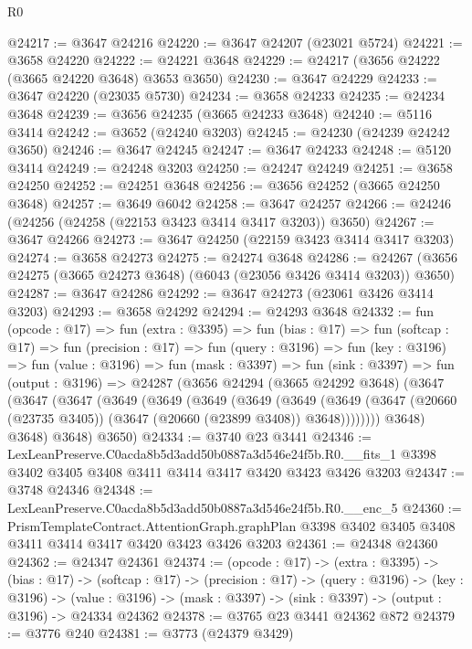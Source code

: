 \begin{lexlean}{R0}
\begin{coremodule}
@24217 := @3647 @24216
@24220 := @3647 @24207 (@23021 @5724)
@24221 := @3658 @24220
@24222 := @24221 @3648
@24229 := @24217 (@3656 @24222 (@3665 @24220 @3648) @3653 @3650)
@24230 := @3647 @24229
@24233 := @3647 @24220 (@23035 @5730)
@24234 := @3658 @24233
@24235 := @24234 @3648
@24239 := @3656 @24235 (@3665 @24233 @3648)
@24240 := @5116 @3414
@24242 := @3652 (@24240 @3203)
@24245 := @24230 (@24239 @24242 @3650)
@24246 := @3647 @24245
@24247 := @3647 @24233
@24248 := @5120 @3414
@24249 := @24248 @3203
@24250 := @24247 @24249
@24251 := @3658 @24250
@24252 := @24251 @3648
@24256 := @3656 @24252 (@3665 @24250 @3648)
@24257 := @3649 @6042
@24258 := @3647 @24257
@24266 := @24246 (@24256 (@24258 (@22153 @3423 @3414 @3417 @3203)) @3650)
@24267 := @3647 @24266
@24273 := @3647 @24250 (@22159 @3423 @3414 @3417 @3203)
@24274 := @3658 @24273
@24275 := @24274 @3648
@24286 := @24267 (@3656 @24275 (@3665 @24273 @3648) (@6043 (@23056 @3426 @3414 @3203)) @3650)
@24287 := @3647 @24286
@24292 := @3647 @24273 (@23061 @3426 @3414 @3203)
@24293 := @3658 @24292
@24294 := @24293 @3648
@24332 := fun (opcode : @17) =>
  fun (extra : @3395) =>
  fun (bias : @17) =>
  fun (softcap : @17) =>
  fun (precision : @17) =>
  fun (query : @3196) =>
  fun (key : @3196) =>
  fun (value : @3196) =>
  fun (mask : @3397) =>
  fun (sink : @3397) =>
  fun (output : @3196) =>
  @24287
    (@3656
      @24294
      (@3665 @24292 @3648)
      (@3647
        (@3647
          (@3647
            (@3649
              (@3649
                (@3649
                  (@3649
                    (@3649
                      (@3649
                        (@3647 (@20660 (@23735 @3405)) (@3647 (@20660 (@23899 @3408)) @3648))))))))
            @3648)
          @3648)
        @3648)
      @3650)
@24334 := @3740 @23 @3441
@24346 := LexLeanPreserve.C0acda8b5d3add50b0887a3d546e24f5b.R0.__fits_1
    @3398
    @3402
    @3405
    @3408
    @3411
    @3414
    @3417
    @3420
    @3423
    @3426
    @3203
@24347 := @3748 @24346
@24348 := LexLeanPreserve.C0acda8b5d3add50b0887a3d546e24f5b.R0.__enc_5
@24360 := PrismTemplateContract.AttentionGraph.graphPlan
    @3398
    @3402
    @3405
    @3408
    @3411
    @3414
    @3417
    @3420
    @3423
    @3426
    @3203
@24361 := @24348 @24360
@24362 := @24347 @24361
@24374 := (opcode : @17) ->
  (extra : @3395) ->
  (bias : @17) ->
  (softcap : @17) ->
  (precision : @17) ->
  (query : @3196) ->
  (key : @3196) ->
  (value : @3196) -> (mask : @3397) -> (sink : @3397) -> (output : @3196) -> @24334 @24362
@24378 := @3765 @23 @3441 @24362 @872
@24379 := @3776 @240
@24381 := @3773 (@24379 @3429)

\end{coremodule}
\end{lexlean}
